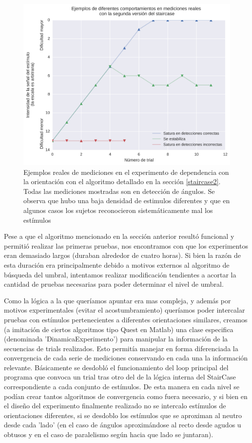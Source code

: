\documentclass{article}
\begin{document}
    \begin{figure}
        \center
        \includegraphics[width=\textwidth]{Imagenes/StairCase2.png}
        \caption{Ejemplos reales de mediciones en el experimento de dependencia con la orientación con el algoritmo detallado en la sección \ref{staircase2}. Todas las mediciones mostradas son en detección de ángulos. Se observa que hubo una baja densidad de estimulos diferentes y que en algunos casos los sujetos reconocieron sistemáticamente mal los estímulos}
        \label{fig:staircase2}
    \end{figure}  
    
    Pese a que el algoritmo mencionado en la sección anterior resultó funcional y permitió realizar las primeras pruebas, nos encontramos con que los experimentos eran demasiado largos (duraban alrededor de cuatro horas). Si bien la razón de esta duración era principalmente debido a motivos externos al algoritmo de búsqueda del umbral, intentamos realizar modificación tendientes a acortar la cantidad de pruebas necesarias para poder determinar el nivel de umbral. 
    
    Como la lógica a la que queríamos apuntar era mas compleja, y además por motivos experimentales (evitar el acostumbramiento) queríamos poder intercalar pruebas con estímulos pertenecientes a diferentes orientaciones similares, creamos (a imitación de ciertos algoritmos tipo Quest en Matlab) una clase especifica (denominada 'DinamicaExperimento') para manipular la información de la secuencias de trials realizados. Esto permitía manejar en forma diferenciada la convergencia de cada serie de mediciones conservando en cada una la información relevante. Básicamente se desdobló el funcionamiento del loop principal del programa que convoca un trial tras otro del de la lógica interna del StairCase correspondiente a cada conjunto de estímulos. De esta manera en cada nivel se podían crear tantos algoritmos de convergencia como fuera necesario, y si bien en el diseño del experimento finalmente realizado no se intercalo estímulos de orientaciones diferentes, si se desdoblo los estímulos que se aproximan al neutro desde cada 'lado' (en el caso de ángulos aproximándose al recto desde agudos u obtusos y en el caso de paralelismo según hacia que lado se juntaran).
    
\end{document}
